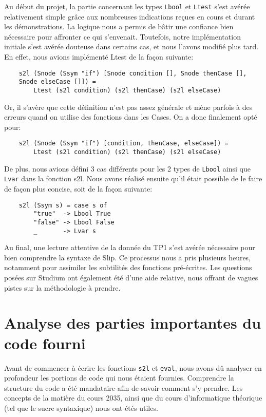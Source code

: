 \documentclass{article}
\begin{document}
\noindent Au début du projet, la partie concernant les types \texttt{Lbool} et \texttt{Ltest} s’est avérée relativement simple grâce aux nombreuses indications reçues en cours et durant les démonstrations. La logique nous a permis de bâtir une confiance bien nécessaire pour affronter ce qui s'envenait. Toutefois, notre implémentation initiale s'est avérée douteuse dans certains cas, et nous l'avons modifié plus tard. En effet, nous avions implémenté Ltest de la façon suivante:
{\footnotesize
\begin{verbatim}
    s2l (Snode (Ssym "if") [Snode condition [], Snode thenCase [], 
    Snode elseCase []]) = 
        Ltest (s2l condition) (s2l thenCase) (s2l elseCase)
\end{verbatim}
}
\noindent Or, il s'avère que cette définition n'est pas assez générale et mène parfois à des erreurs quand on utilise des fonctions dans les Cases. On a donc finalement opté pour:
{\footnotesize
\begin{verbatim}
    s2l (Snode (Ssym "if") [condition, thenCase, elseCase]) = 
        Ltest (s2l condition) (s2l thenCase) (s2l elseCase)
\end{verbatim}
}
\noindent De plus, nous avions défini 3 cas différents pour les 2 types de \texttt{Lbool} ainsi que \texttt{Lvar} dans la fonction s2l. Nous avons réalisé ensuite qu'il était possible de le faire de façon plus concise, soit de la façon suivante:
{\footnotesize
\begin{verbatim}
    s2l (Ssym s) = case s of
        "true"  -> Lbool True
        "false" -> Lbool False
        _       -> Lvar s
\end{verbatim}
}
\noindent Au final, une lecture attentive de la donnée du TP1 s'est avérée nécessaire pour bien comprendre la syntaxe de Slip. Ce processus nous a pris plusieurs heures, notamment pour assimiler les subtilités des fonctions pré-écrites. Les questions posées sur Studium ont également été d'une aide relative, nous offrant de vagues pistes sur la méthodologie à prendre.

\section{Analyse des parties importantes du code fourni}

\noindent Avant de commencer à écrire les fonctions \texttt{s2l} et \texttt{eval}, nous avons dû analyser en profondeur les portions de code qui nous étaient fournies. Comprendre la structure du code a été mandataire afin de savoir comment s'y prendre. Les concepts de la matière du cours 2035, ainsi que du cours d'informatique théorique (tel que le sucre syntaxique) nous ont étés utiles. 
\end{document}
